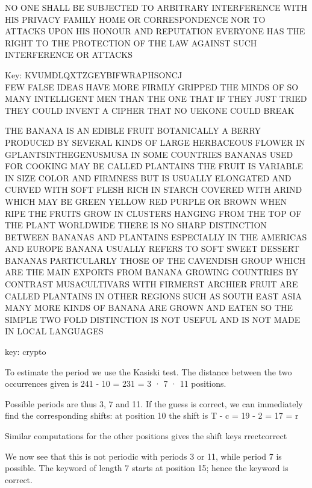 \documentclass[12pt,a4paper]{article}
\begin{document}
\frontpart

 \exercise
	NO ONE SHALL BE SUBJECTED TO ARBITRARY INTERFERENCE WITH HIS PRIVACY FAMILY HOME OR CORRESPONDENCE NOR TO ATTACKS UPON HIS HONOUR AND REPUTATION EVERYONE HAS THE RIGHT TO THE PROTECTION OF THE LAW AGAINST SUCH INTERFERENCE OR ATTACKS



 \exercise
 	Key: KVUMDLQXTZGEYBIFWRAPHSONCJ \\
 	FEW FALSE IDEAS HAVE MORE FIRMLY GRIPPED THE MINDS OF SO MANY INTELLIGENT MEN THAN THE ONE THAT IF THEY JUST TRIED THEY COULD INVENT A CIPHER THAT NO UEKONE COULD BREAK

 \exercise
 	THE BANANA IS AN EDIBLE FRUIT BOTANICALLY A BERRY PRODUCED BY SEVERAL KINDS OF LARGE HERBACEOUS FLOWER IN GPLANTSINTHEGENUSMUSA IN SOME COUNTRIES BANANAS 
	USED FOR COOKING MAY BE CALLED PLANTAINS THE FRUIT IS VARIABLE IN SIZE COLOR AND FIRMNESS BUT IS USUALLY ELONGATED AND CURVED WITH SOFT FLESH RICH IN STARCH
	COVERED WITH ARIND WHICH MAY BE GREEN YELLOW RED PURPLE OR BROWN WHEN RIPE THE FRUITS GROW IN CLUSTERS HANGING FROM THE TOP OF THE PLANT WORLDWIDE
	THERE IS NO SHARP DISTINCTION BETWEEN BANANAS AND PLANTAINS ESPECIALLY IN THE AMERICAS AND EUROPE BANANA USUALLY REFERS TO SOFT SWEET DESSERT BANANAS 
	PARTICULARLY THOSE OF THE CAVENDISH GROUP WHICH ARE THE MAIN EXPORTS FROM BANANA GROWING COUNTRIES BY CONTRAST MUSACULTIVARS WITH FIRMERST ARCHIER FRUIT ARE CALLED 
	PLANTAINS IN OTHER REGIONS SUCH AS SOUTH EAST ASIA MANY MORE KINDS OF BANANA ARE GROWN AND EATEN SO THE SIMPLE TWO FOLD DISTINCTION IS NOT USEFUL AND IS NOT 
	MADE IN LOCAL LANGUAGES

	key: crypto


 \exercise
 To estimate the period we use the Kasiski test. The distance between the two occurrences
 given is
 241 - 10 = 231 = 3 · 7 · 11
 positions.
 
 Possible periods are thus 3, 7 and 11. If the guess is correct, we can immediately find the
 corresponding shifts: at position 10 the shift is
 T - c = 19 - 2 = 17 = r
 
 Similar computations for the other positions gives the shift keys
 rrectcorrect
 
 We now see that this is not periodic with periods 3 or 11, while period 7 is possible. The keyword
 of length 7 starts at position 15; hence the keyword is
 correct. 


 \exercise

%  
%
%
%  
%
%  
%	
%
%
%
%
%
%
%
\end{document}
